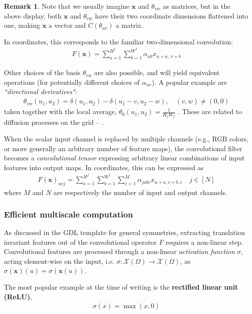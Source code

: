 \documentclass[12pt]{article}
\numberwithin{equation}{section}
\theoremstyle{definition}
\newtheorem{rmk}[thm]{Remark}
\newcommand{		\cX		}	{	\mathcal{X}				}
\newcommand{		\eq		}[1]	{	\begin{align*}#1\end{align*}	}%
\newcommand{		\B		}	{\textbf					} %
\newcommand{		\Oh		}	{	\Omega					}
\newcommand{		\1		}	{	\bm{1}					}%
\begin{document}
\begin{rmk} Note that we usually imagine $\mathbf{x}$ and $\theta_{vw}$ as matrices, but in the above display, both $\mathbf{x}$ and $\theta_{vw}$ have their two coordinate dimensions flattened into one, making $\mathbf{x}$ a vector and $C(\theta_{uv})$ a matrix. 

\end{rmk}

In coordinates, this corresponds to the familiar two-dimensional convolution:
\eq{
F(\mathbf{x}) = \sum_{a=1}^{H^f} \sum_{b = 1}^{W^f} \alpha_{ab} x_{u + a,\, v+b} 
}

Other choices of the basis $\theta_{vw}$ are also possible, and will yield equivalent operations (for potentially different choices of $\alpha_{uv}$). A popular example are \emph{``directional derivatives"}:
\eq{
\theta_{vw}(u_1, u_2) = \delta(u_1, u_2) - \delta(u_1- v, u_2 - w), \quad (v,w) \neq (0,0) 
}
taken together with the local average, $\theta_0 (u_1, u_2) = \tfrac{1}{ H_f W_f }$ . These are related to diffusion processes on the grid -- \cite{BBCV21}.

When the scalar input channel is replaced by multiple channels (e.g., RGB colors, or more generally an arbitrary number of feature maps), the convolutional filter becomes a \emph{convolutional tensor} expressing arbitrary linear combinations of input features into output maps. In coordinates, this can be expressed as
\begin{align}
\label{eq:conv_layer}
F(\mathbf{x})_{uvj} 
	= 
		\sum_{a =1}^{H^f} 
			\sum_{b=1}^{W^f} 
				\sum_{c = 1}^M 
					\alpha_{jabc} 
					x_{u+a, v+ b, c}
					\quad
					j \in [ N ] 
\end{align}
where $M$ and $N$ are respectively the number of input and output channels. 

\subsubsection*{Efficient multiscale computation}

As discussed in the GDL template for general symmetries, extracting translation invariant features out of the convolutional operator $F$ requires a non-linear step. Convolutional features are processed through a non-linear \emph{activation function} $\sigma$, acting element-wise on the input, i.e. $\sigma : \cX(\Oh) \to \cX(\Oh)$, as $\sigma(\mathbf{x}) (u ) = \sigma( \mathbf{x}(u) )$. 

The most popular example at the time of writing is the \B{rectified linear unit (ReLU)},
\eq{
\sigma(x) = \max(x,0) 
}
\end{document}
